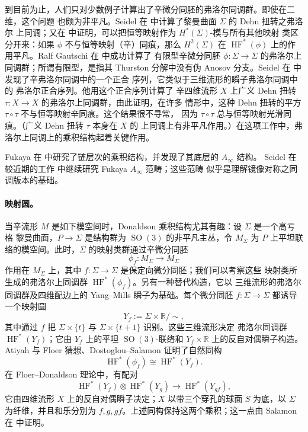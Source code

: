 \begin{remark}\label{rem:12-6-1}
到目前为止，人们只对少数例子计算出了辛微分同胚的弗洛尔同调群。即使在二维，这个问题
也颇为非平凡。Seidel 在  中计算了黎曼曲面 $\Sigma$ 的 Dehn 扭转之弗洛尔
上同调；又在  中证明，可以把恒等映射作为 $H^*(\Sigma)$-模与所有其他映射
类区分开来：如果 $\phi$ 不与恒等映射（辛）同痕，那么 $H^2(\Sigma)$ 在
$\operatorname{HF}^*(\phi)$ 上的作用平凡。Ralf Gautschi 在  中成功计算了
有限型辛微分同胚 $\phi:\Sigma\to\Sigma$ 的弗洛尔上同调群；所谓有限型，是指其 Thurston
分解中没有伪 Anosov 分支。Seidel 在  中发现了辛弗洛尔同调中的一个正合
序列，它类似于三维流形的瞬子弗洛尔同调中的 弗洛尔正合序列。他用这个正合序列计算了
辛四维流形 $X$ 上广义 Dehn 扭转 $\tau:X\to X$ 的弗洛尔上同调群，由此证明，在许多
情形中，这种 Dehn 扭转的平方 $\tau\circ\tau$ 不与恒等映射辛同痕。这个结果很不寻常，
因为 $\tau\circ\tau$ 总与恒等映射光滑同痕。（广义 Dehn 扭转 $\tau$ 本身在 $X$ 的
上同调上有非平凡作用。）在这项工作中，弗洛尔上同调上的乘积结构起着关键作用。

Fukaya 在  中研究了链层次的乘积结构，并发现了其底层的 $A_\infty$ 结构。
Seidel 在较近期的工作  中继续研究 Fukaya $A_\infty$ 范畴；这些范畴
似乎是理解镜像对称之同调版本的基础。

\paragraph{映射圆。}
当辛流形 $M$ 是如下模空间时，Donaldson 乘积结构尤其有趣：设 $\Sigma$ 是一个高亏格
黎曼曲面，$P\to\Sigma$ 是结构群为 $\operatorname{SO}(3)$ 的非平凡主丛，令 $M_\Sigma$
为 $P$ 上平坦联络的模空间。此时，$\Sigma$ 的映射类群通过辛微分同胚
\[
  \phi_f:M_\Sigma\longrightarrow M_\Sigma
\]
作用在 $M_\Sigma$ 上，其中 $f:\Sigma\to\Sigma$ 是保定向微分同胚；我们可以考察这些
映射类所生成的弗洛尔上同调群 $\operatorname{HF}^*(\phi_f)$。另有一种替代构造，它以
三维流形的弗洛尔同调群及四维配边上的 Yang--Mills 瞬子为基础。每个微分同胚
$f:\Sigma\to\Sigma$ 都诱导一个映射圆
\[
  Y_f:=\Sigma\times\mathbb R/\sim,
\]
其中通过 $f$ 把 $\Sigma\times\{t\}$ 与 $\Sigma\times\{t+1\}$ 识别。这些三维流形决定
弗洛尔同调群 $\operatorname{HF}^*(Y_f)$；它由 $Y_f$ 上的平坦
$\operatorname{SO}(3)$-联络和 $Y_f\times\mathbb R$ 上的反自对偶瞬子构造。Atiyah 与
Floer 猜想、Dostoglou--Salamon  证明了自然同构
\[
  \operatorname{HF}^*(\phi_f)\cong\operatorname{HF}^*(Y_f).
\]
在 Floer--Donaldson 理论中，有配对
\[
  \operatorname{HF}^*(Y_f)\otimes\operatorname{HF}^*(Y_g)
  \longrightarrow\operatorname{HF}^*(Y_{gf}),
\]
它由四维流形 $X$ 上的反自对偶瞬子决定；$X$ 以带三个穿孔的球面 $S$ 为底，以 $\Sigma$
为纤维，并且和乐分别为 $f,g,gf$。上述同构保持这两个乘积；这一点由 Salamon
在  中证明。


\end{remark}
